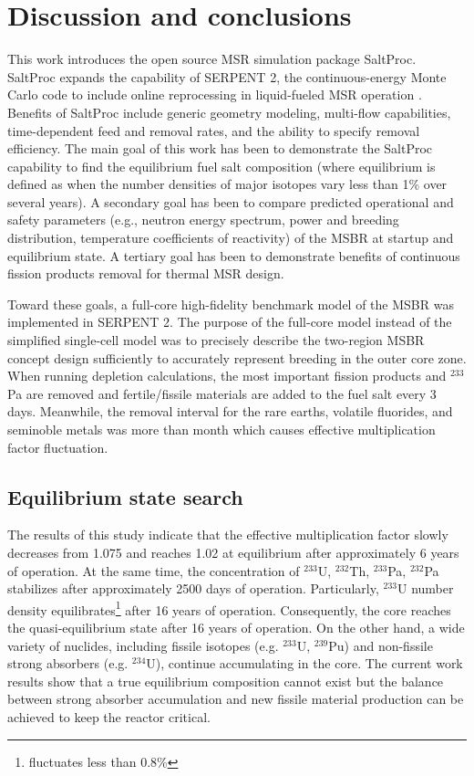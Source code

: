\section{Discussion and conclusions}

This work introduces the open source \gls{MSR} simulation package SaltProc. 
SaltProc expands the capability of SERPENT 2, the continuous-energy Monte Carlo 
code to include online reprocessing in liquid-fueled \gls{MSR} operation 
\cite{andrei_rykhlevskii_arfc/saltproc:_2018}. Benefits of SaltProc include 
generic geometry modeling, multi-flow capabilities, time-dependent feed and 
removal rates, and the ability to specify removal efficiency. The main goal of 
this work has 
been to demonstrate the SaltProc capability to find the equilibrium fuel salt 
composition (where equilibrium is defined as when the number densities of major 
isotopes vary less than 1\% over several years). A secondary goal has been to 
compare predicted operational and safety parameters (e.g., neutron energy 
spectrum, power and breeding distribution, temperature coefficients of 
reactivity) of the \gls{MSBR} at startup and equilibrium state. A tertiary goal 
has been to demonstrate benefits of continuous fission products removal for 
thermal \gls{MSR} design.

Toward these goals, a full-core high-fidelity benchmark model of the \gls{MSBR} 
was implemented in SERPENT 2. The purpose of the full-core model instead of 
the simplified single-cell model \cite{betzler_molten_2017, 
rykhlevskii_online_2017, betzler_fuel_2018} was to precisely describe the 
two-region \gls{MSBR} concept design sufficiently to accurately represent 
breeding in the outer core zone. When running depletion calculations, the most 
important fission products and $^{233}$Pa are removed and fertile/fissile 
materials are added to the fuel salt every 3 days.  Meanwhile, the removal 
interval for the rare earths, volatile fluorides, and seminoble metals was more 
than month which causes effective multiplication factor fluctuation. 

\subsection{Equilibrium state search}
The results of this study indicate that the effective multiplication factor 
slowly decreases from 1.075 and reaches 1.02 at equilibrium after approximately 
6 years of operation. At the same time, the concentration of $^{233}$U, $^{232}$Th, 
$^{233}$Pa, $^{232}$Pa stabilizes after approximately 2500 days of operation. 
Particularly, $^{233}$U number density equilibrates\footnote{fluctuates less 
than 0.8\%} after 16 years of operation. Consequently, the core reaches the quasi-equilibrium state 
after 16 years of operation. On the other hand, a wide variety of nuclides, 
including fissile isotopes (e.g. $^{233}$U, $^{239}$Pu) and non-fissile strong 
absorbers (e.g. $^{234}$U), continue accumulating in the core. The current work results 
show that a true equilibrium composition cannot exist but the balance
between strong absorber accumulation and new fissile material 
production can be achieved to keep the reactor critical.

